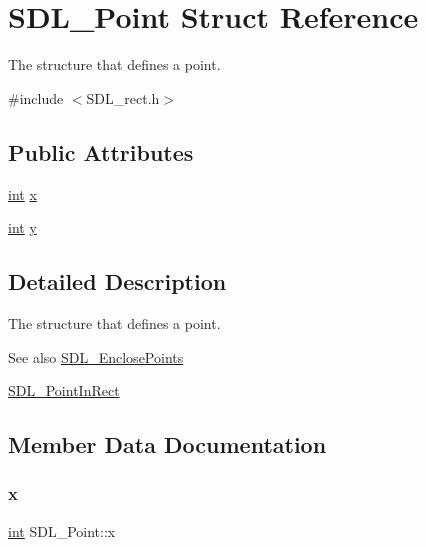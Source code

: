 \hypertarget{struct_s_d_l___point}{}\section{S\+D\+L\+\_\+\+Point Struct Reference}
\label{struct_s_d_l___point}


The structure that defines a point.  




{\ttfamily \#include $<$S\+D\+L\+\_\+rect.\+h$>$}

\subsection*{Public Attributes}
\begin{DoxyCompactItemize}
\item 
\mbox{\hyperlink{warnings_8h_a74f207b5aa4ba51c3a2ad59b219a423b}{int}} \mbox{\hyperlink{struct_s_d_l___point_a2ee987d59888024771c8d83aec43056c}{x}}
\item 
\mbox{\hyperlink{warnings_8h_a74f207b5aa4ba51c3a2ad59b219a423b}{int}} \mbox{\hyperlink{struct_s_d_l___point_aaa68aefa869f6bdf46367a70bd9414b0}{y}}
\end{DoxyCompactItemize}


\subsection{Detailed Description}
The structure that defines a point. 

\begin{DoxySeeAlso}{See also}
\mbox{\hyperlink{_s_d_l__rect_8h_afcbb58dbba760b9e6fdb4b5d1ece015c}{S\+D\+L\+\_\+\+Enclose\+Points}} 

\mbox{\hyperlink{_s_d_l__rect_8h_a2f9708f2739ef234c34e6feda50b4d2c}{S\+D\+L\+\_\+\+Point\+In\+Rect}} 
\end{DoxySeeAlso}


\subsection{Member Data Documentation}
\mbox{\label{struct_s_d_l___point_a2ee987d59888024771c8d83aec43056c}} 
\subsubsection{\texorpdfstring{x}{x}}
{\footnotesize\ttfamily \mbox{\hyperlink{warnings_8h_a74f207b5aa4ba51c3a2ad59b219a423b}{int}} S\+D\+L\+\_\+\+Point\+::x}

